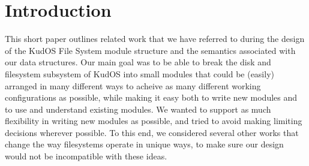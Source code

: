 \section{Introduction}
\label{sec:intro}

This short paper outlines related work that we have referred to during
the design of the KudOS File System module structure and the semantics
associated with our data structures. Our main goal was to be able to
break the disk and filesystem subsystem of KudOS into small modules
that could be (easily) arranged in many different ways to acheive as
many different working configurations as possible, while making it
easy both to write new modules and to use and understand existing
modules. We wanted to support as much flexibility in writing new
modules as possible, and tried to avoid making limiting decisions
wherever possible. To this end, we considered several other works that
change the way filesystems operate in unique ways, to make sure our
design would not be incompatible with these ideas.
